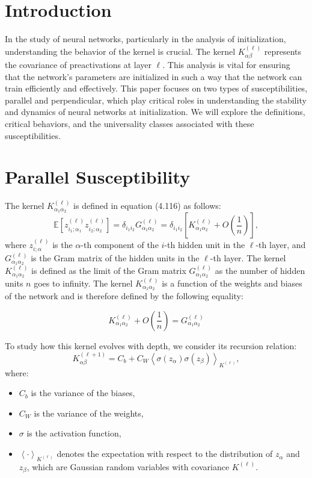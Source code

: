 \documentclass{article}
\begin{document}
\section*{Introduction}

In the study of neural networks, particularly in the analysis of initialization, understanding the behavior of the kernel is crucial. The kernel $K_{\alpha \beta}^{(\ell)}$ represents the covariance of preactivations at layer $\ell$. This analysis is vital for ensuring that the network's parameters are initialized in such a way that the network can train efficiently and effectively. This paper focuses on two types of susceptibilities, parallel and perpendicular, which play critical roles in understanding the stability and dynamics of neural networks at initialization. We will explore the definitions, critical behaviors, and the universality classes associated with these susceptibilities.

\section{Parallel Susceptibility}

The kernel $K^{(\ell)}_{\alpha_1 \alpha_2}$ is defined in equation (4.116) as follows:
\[
\mathbb{E} \left[ z^{(\ell)}_{i_1;\alpha_1} z^{(\ell)}_{i_2;\alpha_2} \right] = \delta_{i_1 i_2} G^{(\ell)}_{\alpha_1 \alpha_2} = \delta_{i_1 i_2} \left[ K^{(\ell)}_{\alpha_1 \alpha_2} + O\left(\frac{1}{n}\right) \right],
\]
where $z^{(\ell)}_{i;\alpha}$ is the $\alpha$-th component of the $i$-th hidden unit in the $\ell$-th layer, and $G^{(\ell)}_{\alpha_1 \alpha_2}$ is the Gram matrix of the hidden units in the $\ell$-th layer. The kernel $K^{(\ell)}_{\alpha_1 \alpha_2}$ is defined as the limit of the Gram matrix $G^{(\ell)}_{\alpha_1 \alpha_2}$ as the number of hidden units $n$ goes to infinity. The kernel $K^{(\ell)}_{\alpha_1 \alpha_2}$ is a function of the weights and biases of the network and is therefore defined by the following equality:

\[
K^{(\ell)}_{\alpha_1 \alpha_2} + O\left(\frac{1}{n}\right) =  G^{(\ell)}_{\alpha_1 \alpha_2}
\]

To study how this kernel evolves with depth, we consider its recursion relation:
\[
K_{\alpha \beta}^{(\ell + 1)} = C_b + C_W \left\langle \sigma(z_{\alpha}) \sigma(z_{\beta}) \right\rangle_{K^{(\ell)}},
\]
where:
\begin{itemize}
    \item $C_b$ is the variance of the biases,
    \item $C_W$ is the variance of the weights,
    \item $\sigma$ is the activation function,
    \item $\left\langle \cdot \right\rangle_{K^{(\ell)}}$ denotes the expectation with respect to the distribution of $z_{\alpha}$ and $z_{\beta}$, which are Gaussian random variables with covariance $K^{(\ell)}$.
\end{itemize}
\end{document}
